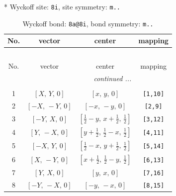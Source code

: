 \documentclass[fleqn,8pt]{jsarticle}
\begin{document}
* Wyckoff site: {\tt 8i}, site symmetry: {\tt m..}
\renewcommand{\arraystretch}{1.2}
\begin{longtable}{cccc}
\caption{Wyckoff bond: {\tt 8a@8i}, bond symmetry: {\tt m..}}
 \\
 \hline \hline
No. & vector & center & mapping \\ \hline \endfirsthead

\multicolumn{3}{l}{\tablename\ \thetable{}} \\
 \hline \hline
No. & vector & center & mapping \\ \hline \endhead

 \hline \hline
\multicolumn{3}{r}{\footnotesize\it continued ...} \\ \endfoot

 \hline \hline
\multicolumn{3}{r}{} \\ \endlastfoot

1 & $\left[ X,\, Y,\, 0 \right]$ & $\left[ x,\, y,\, 0 \right]$ & {\tt [1,10]} \\ \hline
2 & $\left[ - X,\, - Y,\, 0 \right]$ & $\left[ - x,\, - y,\, 0 \right]$ & {\tt [2,9]} \\ \hline
3 & $\left[ - Y,\, X,\, 0 \right]$ & $\left[ \frac{1}{2} - y,\, x + \frac{1}{2},\, \frac{1}{2} \right]$ & {\tt [3,12]} \\ \hline
4 & $\left[ Y,\, - X,\, 0 \right]$ & $\left[ y + \frac{1}{2},\, \frac{1}{2} - x,\, \frac{1}{2} \right]$ & {\tt [4,11]} \\ \hline
5 & $\left[ - X,\, Y,\, 0 \right]$ & $\left[ \frac{1}{2} - x,\, y + \frac{1}{2},\, \frac{1}{2} \right]$ & {\tt [5,14]} \\ \hline
6 & $\left[ X,\, - Y,\, 0 \right]$ & $\left[ x + \frac{1}{2},\, \frac{1}{2} - y,\, \frac{1}{2} \right]$ & {\tt [6,13]} \\ \hline
7 & $\left[ Y,\, X,\, 0 \right]$ & $\left[ y,\, x,\, 0 \right]$ & {\tt [7,16]} \\ \hline
8 & $\left[ - Y,\, - X,\, 0 \right]$ & $\left[ - y,\, - x,\, 0 \right]$ & {\tt [8,15]} \\
\end{longtable}
\renewcommand{\arraystretch}{1.2}
\end{document}
